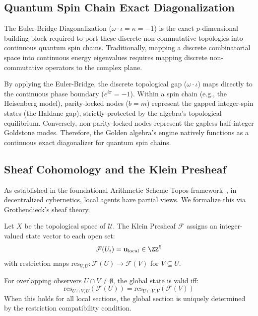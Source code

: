 \subsection{Quantum Spin Chain Exact Diagonalization}

The Euler-Bridge Diagonalization ($\omega \cdot \iota = \kappa = -1$) is the exact $p$-dimensional building block required to port these discrete non-commutative topologies into continuous quantum spin chains. Traditionally, mapping a discrete combinatorial space into continuous energy eigenvalues requires mapping discrete non-commutative operators to the complex plane. 

By applying the Euler-Bridge, the discrete topological gap ($\omega \cdot \iota$) maps directly to the continuous phase boundary ($e^{i\pi} = -1$). Within a spin chain (e.g., the Heisenberg model), parity-locked nodes ($b=m$) represent the gapped integer-spin states (the Haldane gap), strictly protected by the algebra's topological equilibrium. Conversely, non-parity-locked nodes represent the gapless half-integer Goldstone modes. Therefore, the Golden algebra's engine natively functions as a continuous exact diagonalizer for quantum spin chains.

\subsection{Sheaf Cohomology and the Klein Presheaf}

As established in the foundational Arithmetic Scheme Topos framework~\cite{larue_lc}, in decentralized cybernetics, local agents have partial views. We formalize this via Grothendieck's sheaf theory.

\begin{definition}\label{def:presheaf}
Let $X$ be the topological space of $\mathcal{U}$. The Klein Presheaf $\mathcal{F}$ assigns an integer-valued state vector to each open set:
$$\mathcal{F}(U_i) = \mathbf{u}_{\text{local}} \in \ZZ^5$$
with restriction maps $\mathrm{res}_{V,U}: \mathcal{F}(U) \to \mathcal{F}(V)$ for $V \subseteq U$.
\end{definition}

\begin{theorem}\label{thm:gluing}
For overlapping observers $U \cap V \neq \emptyset$, the global state is valid iff:
$$\mathrm{res}_{U \cap V, U}(\mathcal{F}(U)) = \mathrm{res}_{U \cap V, V}(\mathcal{F}(V))$$
When this holds for all local sections, the global section is uniquely determined by the restriction compatibility condition.
\end{theorem}

